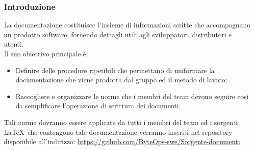 \documentclass{article}
\begin{document}
\subsubsection{Introduzione}
La documentazione costituisce l'insieme di informazioni scritte che accompagnano un prodotto software, fornendo dettagli utili agli sviluppatori, distributori e utenti.\\
Il suo obiettivo principale è:
\begin{itemize}
    \item  Definire delle procedure ripetibili che permettano di uniformare la documentazione che viene prodotta dal gruppo ed il metodo di lavoro;
    \item  Raccogliere e organizzare le norme che i membri del team devono seguire così da semplificare l'operazione di scrittura dei documenti.
\end{itemize}
Tali norme dovranno essere applicate da tutti i membri del team ed i sorgenti \LaTeX\ che contengono tale documentazione verranno inseriti nel repository disponibile all'indirizzo:
\href{https://github.com/ByteOps-swe/Sorgente-documenti}{https://github.com/ByteOps-swe/Sorgente-documenti}

\end{document}
